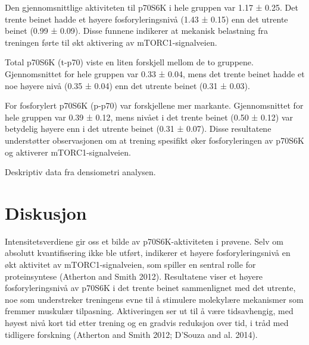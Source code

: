 \documentclass[
  letterpaper,
  DIV=11,
  numbers=noendperiod]{scrreprt}
\begin{document}
Den gjennomsnittlige aktiviteten til p70S6K i hele gruppen var 1.17 ±
0.25. Det trente beinet hadde et høyere fosforyleringsnivå (1.43 ± 0.15)
enn det utrente beinet (0.99 ± 0.09). Disse funnene indikerer at
mekanisk belastning fra treningen førte til økt aktivering av
mTORC1-signalveien.

Total p70S6K (t-p70) viste en liten forskjell mellom de to gruppene.
Gjennomsnittet for hele gruppen var 0.33 ± 0.04, mens det trente beinet
hadde et noe høyere nivå (0.35 ± 0.04) enn det utrente beinet (0.31 ±
0.03).

For fosforylert p70S6K (p-p70) var forskjellene mer markante.
Gjennomsnittet for hele gruppen var 0.39 ± 0.12, mens nivået i det
trente beinet (0.50 ± 0.12) var betydelig høyere enn i det utrente
beinet (0.31 ± 0.07). Disse resultatene understøtter observasjonen om at
trening spesifikt øker fosforyleringen av p70S6K og aktiverer
mTORC1-signalveien.

\begin{table}

\caption{\label{tbl-resultater}Deskriptiv data fra densiometri
analysen.}


\end{table}%

\section{Diskusjon}\label{diskusjon-4}

Intensitetsverdiene gir oss et bilde av p70S6K-aktiviteten i prøvene.
Selv om absolutt kvantifisering ikke ble utført, indikerer et høyere
fosforyleringsnivå en økt aktivitet av mTORC1-signalveien, som spiller
en sentral rolle for proteinsyntese (Atherton and Smith 2012).
Resultatene viser et høyere fosforyleringsnivå av p70S6K i det trente
beinet sammenlignet med det utrente, noe som understreker treningens
evne til å stimulere molekylære mekanismer som fremmer muskulær
tilpasning. Aktiveringen ser ut til å være tidsavhengig, med høyest nivå
kort tid etter trening og en gradvis reduksjon over tid, i tråd med
tidligere forskning (Atherton and Smith 2012; D'Souza and al. 2014).
\end{document}
